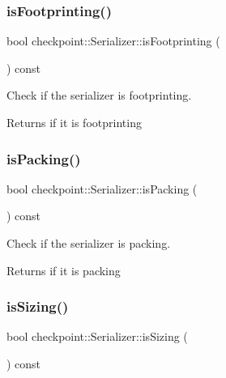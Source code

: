 \subsubsection{\texorpdfstring{is\+Footprinting()}{isFootprinting()}}
{\footnotesize\ttfamily bool checkpoint\+::\+Serializer\+::is\+Footprinting (\begin{DoxyParamCaption}{ }\end{DoxyParamCaption}) const\hspace{0.3cm}{\ttfamily [inline]}}



Check if the serializer is footprinting. 

\begin{DoxyReturn}{Returns}
if it is footprinting 
\end{DoxyReturn}
\mbox{\label{structcheckpoint_1_1_serializer_aee9d2701f508fff94bad836576443cd9}} 
\subsubsection{\texorpdfstring{is\+Packing()}{isPacking()}}
{\footnotesize\ttfamily bool checkpoint\+::\+Serializer\+::is\+Packing (\begin{DoxyParamCaption}{ }\end{DoxyParamCaption}) const\hspace{0.3cm}{\ttfamily [inline]}}



Check if the serializer is packing. 

\begin{DoxyReturn}{Returns}
if it is packing 
\end{DoxyReturn}
\mbox{\label{structcheckpoint_1_1_serializer_a27e3304ca8c9de113675b7692e5aa65f}} 
\subsubsection{\texorpdfstring{is\+Sizing()}{isSizing()}}
{\footnotesize\ttfamily bool checkpoint\+::\+Serializer\+::is\+Sizing (\begin{DoxyParamCaption}{ }\end{DoxyParamCaption}) const\hspace{0.3cm}{\ttfamily [inline]}}



